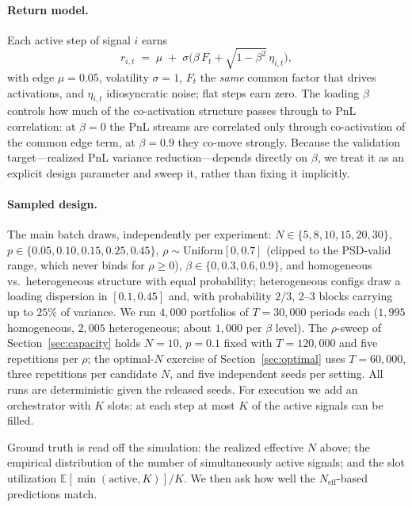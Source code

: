 \documentclass[11pt]{article}
\newcommand{\Neff}{N_{\mathrm{eff}}}
\begin{document}
\paragraph{Return model.} Each active step of signal $i$ earns
\begin{equation}
r_{i,t} \;=\; \mu \;+\; \sigma\big(\beta\,F_t + \sqrt{1-\beta^2}\,\eta_{i,t}\big),
\label{eq:returns}
\end{equation}
with edge $\mu=0.05$, volatility $\sigma=1$, $F_t$ the \emph{same} common factor
that drives activations, and $\eta_{i,t}$ idiosyncratic noise; flat steps earn
zero. The loading $\beta$ controls how much of the co-activation structure
passes through to PnL correlation: at $\beta=0$ the PnL streams are correlated
only through co-activation of the common edge term, at $\beta=0.9$ they co-move
strongly. Because the validation target---realized PnL variance
reduction---depends directly on $\beta$, we treat it as an explicit design
parameter and sweep it, rather than fixing it implicitly.

\paragraph{Sampled design.} The main batch draws, independently per experiment:
$N\in\{5,8,10,15,20,30\}$, $p\in\{0.05,0.10,0.15,0.25,0.45\}$,
$\rho\sim\mathrm{Uniform}[0,0.7]$ (clipped to the PSD-valid range, which never
binds for $\rho\ge0$), $\beta\in\{0,0.3,0.6,0.9\}$, and homogeneous vs.\
heterogeneous structure with equal probability; heterogeneous configs draw a
loading dispersion in $[0.1,0.45]$ and, with probability $2/3$, 2--3 blocks
carrying up to $25\%$ of variance. We run $4{,}000$ portfolios of $T=30{,}000$
periods each ($1{,}995$ homogeneous, $2{,}005$ heterogeneous; about $1{,}000$
per $\beta$ level). The $\rho$-sweep of Section~\ref{sec:capacity} holds
$N=10$, $p=0.1$ fixed with $T=120{,}000$ and five repetitions per $\rho$; the
optimal-$N$ exercise of Section~\ref{sec:optimal} uses $T=60{,}000$, three
repetitions per candidate $N$, and five independent seeds per setting. All runs
are deterministic given the released seeds. For execution we add an
orchestrator with $K$ slots: at each step at most $K$ of the active signals can
be filled.

Ground truth is read off the simulation: the realized effective $N$ above; the
empirical distribution of the number of simultaneously active signals; and the
slot utilization $\mathbb{E}[\min(\text{active},K)]/K$. We then ask how well the
$\Neff$-based predictions match.
\end{document}
